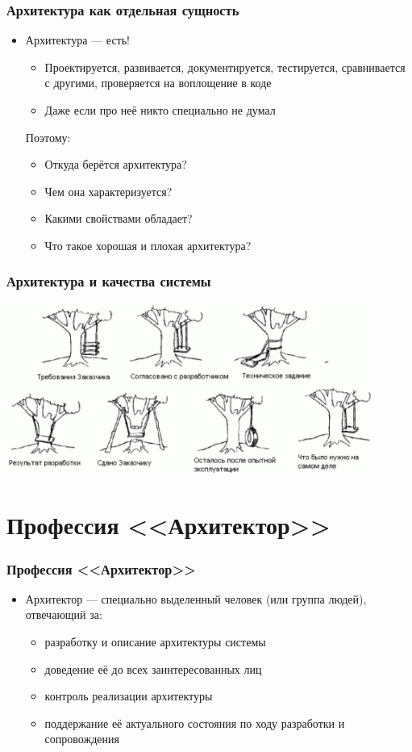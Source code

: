 \documentclass[xetex,mathserif,serif]{beamer}
\begin{document}
	\begin{frame}
		\frametitle{Архитектура как отдельная сущность}
		\begin{itemize}
			\item Архитектура --- есть!
			\begin{itemize}
				\item Проектируется, развивается, документируется, тестируется, сравнивается с другими, проверяется на воплощение в коде
				\item Даже если про неё никто специально не думал
			\end{itemize}
			Поэтому:
			\begin{itemize}
				\item Откуда берётся архитектура?
				\item Чем она характеризуется?
				\item Какими свойствами обладает?
				\item Что такое хорошая и плохая архитектура?
			\end{itemize}
		\end{itemize}
	\end{frame}

	\begin{frame}
		\frametitle{Архитектура и качества системы}
		\begin{center}
			\includegraphics[width=0.9\textwidth]{architectureAndRequirements.png}
		\end{center}
	\end{frame}

	\section{Профессия <<Архитектор>>}

	\begin{frame}
		\frametitle{Профессия <<Архитектор>>}
		\begin{itemize}
			\item Архитектор --- специально выделенный человек (или группа людей), отвечающий за:
			\begin{itemize}
				\item разработку и описание архитектуры системы
				\item доведение её до всех заинтересованных лиц
				\item контроль реализации архитектуры
				\item поддержание её актуального состояния по ходу разработки и сопровождения
			\end{itemize}
		\end{itemize}
	\end{frame}
\end{document}
